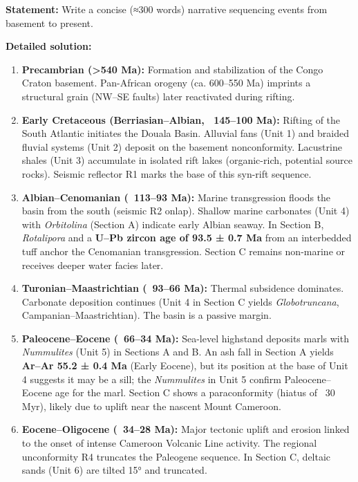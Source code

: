 \documentclass[11pt]{article}
\newcommand{\cle}[1]{{\popxbold\color{popdark}#1}}
\begin{document}
\begin{exoresolu}
\textbf{Statement:} Write a concise (≈300 words) narrative sequencing events from basement to present.

\tcblower
\textbf{Detailed solution:}
\begin{enumerate}
    \item \textbf{Precambrian (>540 Ma):} Formation and stabilization of the \cle{Congo Craton} basement. Pan-African orogeny (ca. 600–550 Ma) imprints a structural grain (NW–SE faults) later reactivated during rifting.
    \item \textbf{Early Cretaceous (Berriasian–Albian, ~145–100 Ma):} \cle{Rifting} of the South Atlantic initiates the Douala Basin. Alluvial fans (Unit 1) and braided fluvial systems (Unit 2) deposit on the basement \cle{nonconformity}. Lacustrine shales (Unit 3) accumulate in isolated rift lakes (organic-rich, potential source rocks). Seismic reflector R1 marks the base of this syn-rift sequence.
    \item \textbf{Albian–Cenomanian (~113–93 Ma):} Marine transgression floods the basin from the south (seismic R2 onlap). Shallow marine carbonates (Unit 4) with \emph{Orbitolina} (Section A) indicate early Albian seaway. In Section B, \emph{Rotalipora} and a \textbf{U–Pb zircon age of 93.5 ± 0.7 Ma} from an interbedded tuff anchor the Cenomanian transgression. Section C remains non-marine or receives deeper water facies later.
    \item \textbf{Turonian–Maastrichtian (~93–66 Ma):} Thermal subsidence dominates. Carbonate deposition continues (Unit 4 in Section C yields \emph{Globotruncana}, Campanian–Maastrichtian). The basin is a passive margin.
    \item \textbf{Paleocene–Eocene (~66–34 Ma):} Sea-level highstand deposits marls with \emph{Nummulites} (Unit 5) in Sections A and B. An ash fall in Section A yields \textbf{Ar–Ar 55.2 ± 0.4 Ma} (Early Eocene), but its position at the base of Unit 4 suggests it may be a sill; the \emph{Nummulites} in Unit 5 confirm Paleocene–Eocene age for the marl. Section C shows a \cle{paraconformity} (hiatus of ~30 Myr), likely due to uplift near the nascent Mount Cameroon.
    \item \textbf{Eocene–Oligocene (~34–28 Ma):} Major tectonic uplift and erosion linked to the onset of intense \cle{Cameroon Volcanic Line} activity. The \cle{regional unconformity R4} truncates the Paleogene sequence. In Section C, deltaic sands (Unit 6) are tilted 15° and truncated.

\end{enumerate}
\end{exoresolu}
\end{document}
